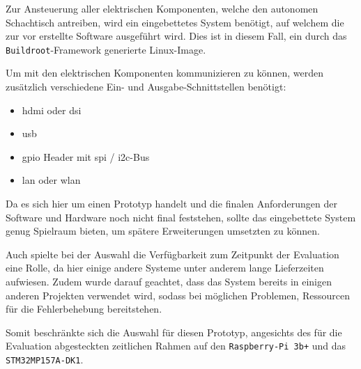 Zur Ansteuerung aller elektrischen Komponenten, welche den autonomen
Schachtisch antreiben, wird ein eingebettetes System benötigt, auf
welchem die zur vor erstellte Software ausgeführt wird. Dies ist in
diesem Fall, ein durch das \passthrough{\lstinline!Buildroot!}-Framework
generierte Linux-Image.

Um mit den elektrischen Komponenten kommunizieren zu können, werden
zusätzlich verschiedene Ein- und Ausgabe-Schnittstellen benötigt:

\begin{itemize}
\tightlist
\item
  \gls{hdmi} oder \gls{dsi}
\item
  \gls{usb}
\item
  \gls{gpio} Header mit \gls{spi} / \gls{i2c}-Bus
\item
  \gls{lan} oder \gls{wlan}
\end{itemize}

Da es sich hier um einen Prototyp handelt und die finalen Anforderungen
der Software und Hardware noch nicht final feststehen, sollte das
eingebettete System genug Spielraum bieten, um spätere Erweiterungen
umsetzten zu können.

Auch spielte bei der Auswahl die Verfügbarkeit zum Zeitpunkt der
Evaluation eine Rolle, da hier einige andere Systeme unter anderem lange
Lieferzeiten aufwiesen. Zudem wurde darauf geachtet, dass das System
bereits in einigen anderen Projekten verwendet wird, sodass bei
möglichen Problemen, Ressourcen für die Fehlerbehebung bereitstehen.

Somit beschränkte sich die Auswahl für diesen Prototyp, angesichts des
für die Evaluation abgesteckten zeitlichen Rahmen auf den
\passthrough{\lstinline!Raspberry-Pi 3b+!} und das
\passthrough{\lstinline!STM32MP157A-DK1!}\label{ref}.

